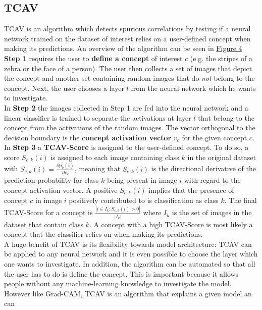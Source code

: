\documentclass{article}
\begin{document}
\subsection{TCAV}
TCAV \cite{pmlr-v80-kim18d} is an algorithm which detects spurious correlations by testing if a neural network trained
on the dataset of interest relies on a user-defined concept when making its predictions. An overview of the algorithm
can be seen in \hyperref[fig:tcav]{Figure 4} \\
\textbf{Step 1} requires the user to \textbf{define a concept} of interest $c$ (e.g. the stripes of a zebra
or the face of a person). The user then collects a set of images that depict the concept and another set
containing random images that do \textit{not} belong to the concept. Next, the user chooses a layer $l$ from
the neural network which he wants to investigate. \\
In \textbf{Step 2} the images collected in Step 1 are fed into the neural network and a linear classifier is trained
to separate the activations at layer $l$ that belong to the concept from the activations of the random images.
The vector orthogonal to the decision boundary is the \textbf{concept activation vector} $v_c$ for the given concept $c$.\\
In \textbf{Step 3} a \textbf{TCAV-Score} is assigned to the user-defined concept. To do so, a score $S_{c,k}(i)$
is assigned to each image containing class $k$ in the original dataset with $S_{c,k}(i) = \frac{\partial p_k(i)}{\partial v_c}$,
meaning that $S_{c,k}(i)$ is the directional derivative of the prediction probability for class $k$ being present
in image $i$ with regard to the concept activation vector. A positive $S_{c,k}(i)$ implies that the presence of
concept $c$ in image $i$ positively contributed to is classification as class $k$.
The final TCAV-Score for a concept is $\frac{|i \in I_k: S_{c,k}(i) > 0 |}{|I_k|}$ where $I_k$ is the set of images
in the dataset that contain class $k$. A concept with a high TCAV-Score is most likely a concept that the classifier
relies on when making its predictions. \\
A huge benefit of TCAV is its flexibility towards model architecture: TCAV can be applied to any neural network and
it is even possible to choose the layer which one wants to investigate. In addition, the algorithm can be automated so
that all the user has to do is define the concept. This is important because it allows people without any machine-learning
knowledge to investigate the model. However like Grad-CAM, TCAV is an algorithm that explains a given model an can
\end{document}
